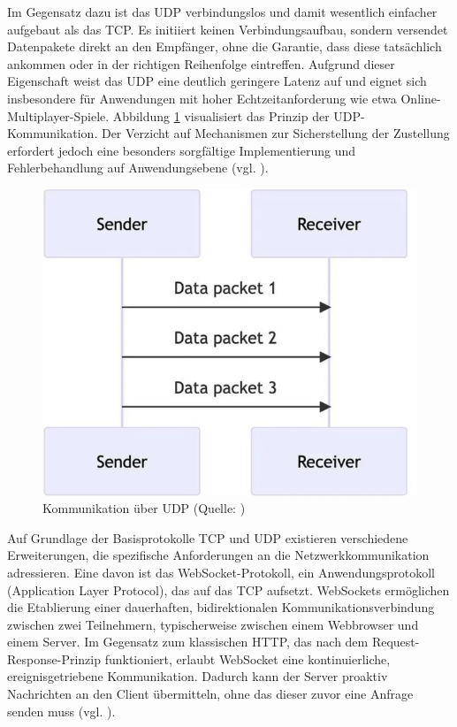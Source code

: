 Im Gegensatz dazu ist das \ac{UDP} verbindungslos und damit wesentlich einfacher aufgebaut als das \ac{TCP}. Es initiiert keinen Verbindungsaufbau, sondern versendet Datenpakete direkt an den Empfänger, ohne die Garantie, dass diese tatsächlich ankommen oder in der richtigen Reihenfolge eintreffen. Aufgrund dieser Eigenschaft weist das \ac{UDP} eine deutlich geringere Latenz auf und eignet sich insbesondere für Anwendungen mit hoher Echtzeitanforderung wie etwa Online-Multiplayer-Spiele. Abbildung \ref{fig:udp} visualisiert das Prinzip der \ac{UDP}-Kommunikation. Der Verzicht auf Mechanismen zur Sicherstellung der Zustellung erfordert jedoch eine besonders sorgfältige Implementierung und Fehlerbehandlung auf Anwendungsebene (vgl. \citealp{mygames_unity_2024}).

\begin{figure}[ht]
\centering
\includegraphics[width=0.5\linewidth]{content/pictures/UDP-Network.png}
\caption{Kommunikation über UDP (Quelle: \citealp{mygames_unity_2024})}
\label{fig:udp}
\end{figure}

Auf Grundlage der Basisprotokolle \ac{TCP} und \ac{UDP} existieren verschiedene Erweiterungen, die spezifische Anforderungen an die Netzwerkkommunikation adressieren. Eine davon ist das WebSocket-Protokoll, ein Anwendungsprotokoll (Application Layer Protocol), das auf das \ac{TCP} aufsetzt. WebSockets ermöglichen die Etablierung einer dauerhaften, bidirektionalen Kommunikationsverbindung zwischen zwei Teilnehmern, typischerweise zwischen einem Webbrowser und einem Server. Im Gegensatz zum klassischen \ac{HTTP}, das nach dem Request-Response-Prinzip funktioniert, erlaubt WebSocket eine kontinuierliche, ereignisgetriebene Kommunikation. Dadurch kann der Server proaktiv Nachrichten an den Client übermitteln, ohne das dieser zuvor eine Anfrage senden muss (vgl. \citealp{mygames_unity_2024}).

